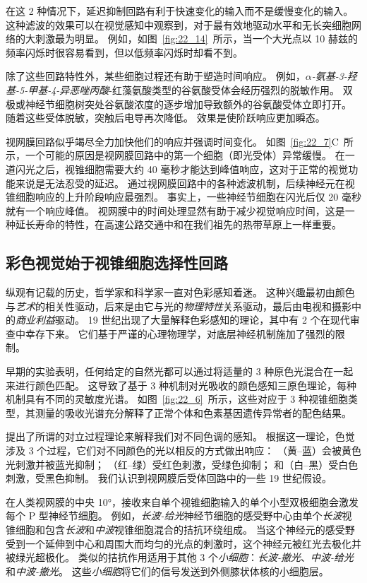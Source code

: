 在这 2 种情况下，延迟抑制回路有利于快速变化的输入而不是缓慢变化的输入。
这种滤波的效果可以在视觉感知中观察到，对于最有效地驱动水平和无长突细胞网络的大刺激最为明显。
例如，如图~\ref{fig:22_14}~所示，当一个大光点以 10 赫兹的频率闪烁时很容易看到，但以低频率闪烁时却看不到。


除了这些回路特性外，某些细胞过程还有助于塑造时间响应。
例如，\textit{$\alpha$-氨基-3-羟基-5-甲基-4-异恶唑丙酸}-红藻氨酸类型的谷氨酸受体会经历强烈的脱敏作用。
双极或神经节细胞树突处谷氨酸浓度的逐步增加导致额外的谷氨酸受体立即打开。
随着这些受体脱敏，突触后电导再次降低。
效果是使阶跃响应更加瞬态。


视网膜回路似乎竭尽全力加快他们的响应并强调时间变化。
如图~\ref{fig:22_7}C~所示，一个可能的原因是视网膜回路中的第一个细胞（即光受体）异常缓慢。
在一道闪光之后，视锥细胞需要大约 40 毫秒才能达到峰值响应，这对于正常的视觉功能来说是无法忍受的延迟。
通过视网膜回路中的各种滤波机制，后续神经元在视锥细胞响应的上升阶段响应最强烈。
事实上，一些神经节细胞在闪光后仅 20 毫秒就有一个响应峰值。
视网膜中的时间处理显然有助于减少视觉响应时间，这是一种延长寿命的特性，在高速公路交通中和在我们祖先的热带草原上一样重要。



\subsection{彩色视觉始于视锥细胞选择性回路}

纵观有记载的历史，哲学家和科学家一直对色彩感知着迷。
这种兴趣最初由颜色与\textit{艺术}的相关性驱动，后来是由它与光的\textit{物理特性}关系驱动，最后由电视和摄影中的\textit{商业利益}驱动。
19 世纪出现了大量解释色彩感知的理论，其中有 2 个在现代审查中幸存下来。
它们基于严谨的心理物理学，对底层神经机制施加了强烈的限制。


早期的实验表明，任何给定的自然光都可以通过将适量的 3 种原色光混合在一起来进行颜色匹配。
这导致了基于 3 种机制对光吸收的颜色感知三原色理论，每种机制具有不同的灵敏度光谱。
如图~\ref{fig:22_6}~所示，这些对应于 3 种视锥细胞类型，其测量的吸收光谱充分解释了正常个体和色素基因遗传异常者的配色结果。


提出了所谓的对立过程理论来解释我们对不同色调的感知。
根据这一理论，色觉涉及 3 个过程，它们对不同颜色的光以相反的方式做出响应：
（黄–蓝）会被黄色光刺激并被蓝光抑制；
（红–绿）受红色刺激，受绿色抑制；
和（白–黑）受白色刺激，受黑色抑制。
我们认识到视网膜后受体回路中的一些 19 世纪假设。


在人类视网膜的中央 10°，接收来自单个视锥细胞输入的单个小型双极细胞会激发每个 P 型神经节细胞。
例如，\textit{长波-给光}神经节细胞的感受野中心由单个\textit{长波}视锥细胞和包含\textit{长波}和\textit{中波}视锥细胞混合的拮抗环绕组成。
当这个神经元的感受野受到一个延伸到中心和周围大而均匀的光点的刺激时，这个神经元被红光去极化并被绿光超极化。
类似的拮抗作用适用于其他 3 个\textit{小细胞}：\textit{长波-撤光}、\textit{中波-给光}和\textit{中波-撤光}。
这些\textit{小细胞}将它们的信号发送到外侧膝状体核的小细胞层。


